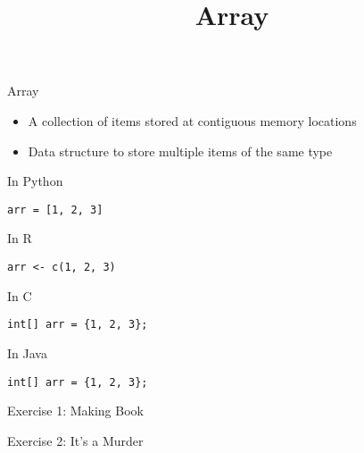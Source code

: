 \documentclass{beamer}
\title{Array}
\begin{document}
\frame{
  \titlepage
}

\begin{frame}[fragile]{Array}
  
  \begin{block}{}
    \begin{itemize}
      \item A collection of items stored at contiguous memory locations
      \item Data structure to store multiple items of the same type
    \end{itemize}
  \end{block}
  
  \begin{block}{}
    \centering
  \end{block}
  
  \begin{minipage}{0.48\textwidth}
    \begin{block}{In Python}
      \begin{lstlisting}[style=codePy]
arr = [1, 2, 3]
      \end{lstlisting}
    \end{block}
    
    \begin{block}{In R}
      \begin{lstlisting}[style=codeR]
arr <- c(1, 2, 3)
      \end{lstlisting}
    \end{block}
  
  \end{minipage}\hfill
  \begin{minipage}{0.48\textwidth}
    \begin{block}{In C}
      \begin{lstlisting}[style=codeC]
int[] arr = {1, 2, 3};
      \end{lstlisting}
    \end{block}
  
    \begin{block}{In Java}
      \begin{lstlisting}[style=codeJ]
int[] arr = {1, 2, 3};
      \end{lstlisting}
    \end{block}
  \end{minipage}
\end{frame}

\begin{frame}{Exercise 1: Making Book}
  
\end{frame}

\begin{frame}{Exercise 2: It's a Murder}
  
\end{frame}
\end{document}

